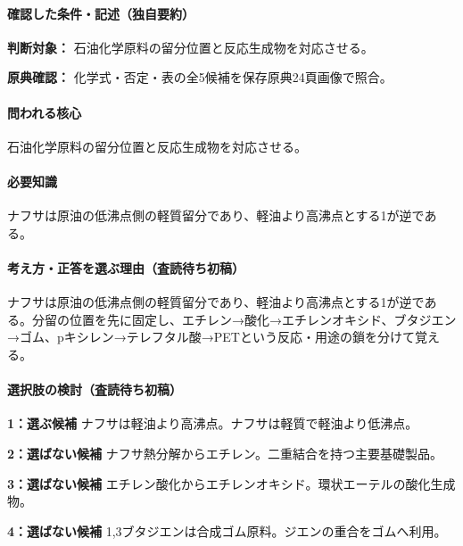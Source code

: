 \paragraph{確認した条件・記述（独自要約）}\mbox{}\par

\noindent\textbf{判断対象：} 石油化学原料の留分位置と反応生成物を対応させる。\par

\noindent\textbf{原典確認：} 化学式・否定・表の全5候補を保存原典24頁画像で照合。\par

\paragraph{問われる核心} 石油化学原料の留分位置と反応生成物を対応させる。

\paragraph{必要知識} ナフサは原油の低沸点側の軽質留分であり、軽油より高沸点とする1が逆である。

\paragraph{考え方・正答を選ぶ理由（査読待ち初稿）} ナフサは原油の低沸点側の軽質留分であり、軽油より高沸点とする1が逆である。分留の位置を先に固定し、エチレン→酸化→エチレンオキシド、ブタジエン→ゴム、pキシレン→テレフタル酸→PETという反応・用途の鎖を分けて覚える。

\paragraph{選択肢の検討（査読待ち初稿）}\mbox{}\par

\noindent\textbf{1：選ぶ候補} ナフサは軽油より高沸点。ナフサは軽質で軽油より低沸点。\par

\noindent\textbf{2：選ばない候補} ナフサ熱分解からエチレン。二重結合を持つ主要基礎製品。\par

\noindent\textbf{3：選ばない候補} エチレン酸化からエチレンオキシド。環状エーテルの酸化生成物。\par

\noindent\textbf{4：選ばない候補} 1,3ブタジエンは合成ゴム原料。ジエンの重合をゴムへ利用。\par


